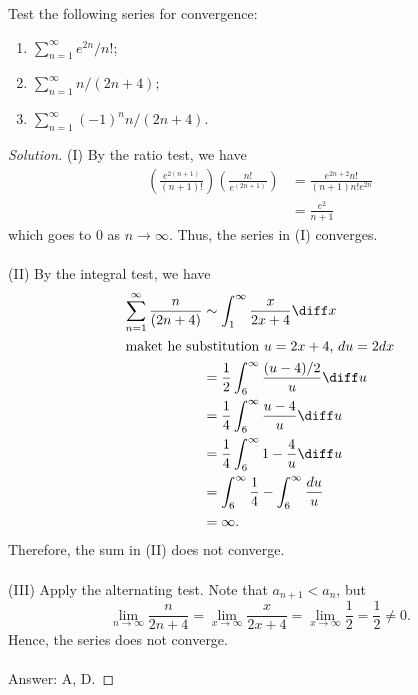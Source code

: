 \begin{problem}
Test the following series for convergence:
\begin{enumerate}[label=(\MakeUppercase{\roman*})]
\item $\sum_{n=1}^\infty e^{2n}/n!$;
\item $\sum_{n=1}^\infty n/(2n+4)$;
\item $\sum_{n=1}^\infty (-1)^nn/(2n+4)$.
\end{enumerate}
\end{problem}
\begin{proof}[Solution]
(I) By the ratio test, we have
\[\begin{aligned}
\left(\frac{e^{2(n+1)}}{(n+1)!}\right)\left(\frac{n!}{e^{(2n+1)}}\right)&=
\frac{e^{2n+2}n!}{(n+1)n!e^{2n}}\\
&=\frac{e^2}{n+1}
\end{aligned}\]
which goes to $0$ as $n\to\infty$. Thus, the series in (I) converges.
\\\\
(II) By the integral test, we have
\begin{align*}
\sum_{n=1}^\infty\frac{n}{(2n+4)}
&\sim\int_1^\infty\frac{x}{2x+4}\diff x\\
\intertext{maket he substitution $u=2x+4$, $du=2dx$}
&=\frac{1}{2}\int_6^\infty\frac{(u-4)/2}{u}\diff u\\
&=\frac{1}{4}\int_6^\infty\frac{u-4}{u}\diff u\\
&=\frac{1}{4}\int_6^\infty1-\frac{4}{u}\diff u\\
&=\int_6^\infty \frac{1}{4}-\int_6^\infty\frac{du}{u}\\
&=\infty.
\end{align*}
Therefore, the sum in (II) does not converge.
\\\\
(III) Apply the alternating test. Note that $a_{n+1}<a_n$, but
\[
\lim_{n\to\infty}\frac{n}{2n+4}=\lim_{x\to\infty}\frac{x}{2x+4}=\lim_{x\to\infty}\frac{1}{2}=\frac{1}{2}\neq 0.
\]
Hence, the series does not converge.
\\\\
Answer: {\color{Green} A}, {\color{Red} D}.
\end{proof}


